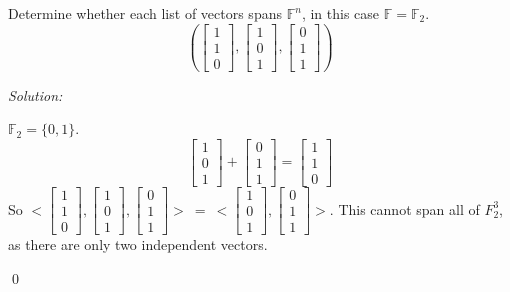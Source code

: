 \documentclass[11 pt]{article}
\newenvironment{problem}[2][Problem]{\begin{trivlist}
\item[\hskip \labelsep {\bfseries #1}\hskip \labelsep {\bfseries #2.}]}{\end{trivlist}}
\newenvironment{sol}
    {\emph{Solution:}
    }
    {
    \qed
    }
\newcommand{\F}{\mathbb{F}} %
\begin{document}
\begin{problem}{2.5.4e}
Determine whether each list of vectors spans $\F^n$, in this case $\F=\F_2$.
\[\left ( \begin{bmatrix}
1\\1\\0
\end{bmatrix},\begin{bmatrix}
1\\0\\1
\end{bmatrix},
\begin{bmatrix}
0\\1\\1
\end{bmatrix}\right )\]
\end{problem}
\begin{sol}
$\F_2=\{0,1\}$.
\[\begin{bmatrix}
1\\0\\1
\end{bmatrix}+
\begin{bmatrix}
0\\1\\1
\end{bmatrix}=
\begin{bmatrix}
1\\1\\0
\end{bmatrix}\]
So $<\begin{bmatrix}
1\\1\\0
\end{bmatrix},\begin{bmatrix}
1\\0\\1
\end{bmatrix},
\begin{bmatrix}
0\\1\\1
\end{bmatrix}>\ =\ <\begin{bmatrix}
1\\0\\1
\end{bmatrix},
\begin{bmatrix}
0\\1\\1
\end{bmatrix}>$. This cannot span all of $F_2^3$, as there are only two independent vectors.
\end{sol}
\end{document}
